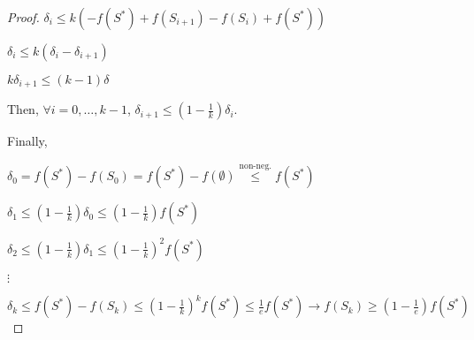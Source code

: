 \begin{proof}
        $\delta_i \leq k (-f(S^*) + f(S_{i+1}) - f(S_i) + f(S^*))$

        $\delta_i \leq k (\delta_i - \delta_{i+1})$

        $k \delta_{i+1} \leq (k-1) \delta$

        Then, $\forall i = 0, \dots, k-1$, $\delta_{i+1} \leq (1 - \frac{1}{k}) \delta_i$.

        Finally,

        $\delta_0 = f(S^*) - f(S_0) = f(S^*) - f(\emptyset) \overset{\text{non-neg.}}{\leq} f(S^*)$

        $\delta_1 \leq (1 - \frac{1}{k}) \delta_0 \leq (1 - \frac{1}{k}) f(S^*)$

        $\delta_2 \leq (1 - \frac{1}{k}) \delta_1 \leq (1 - \frac{1}{k})^2 f(S^*)$

        $\vdots$

        $\delta_k \leq f(S^*) - f(S_k) \leq (1 - \frac{1}{k})^k f(S^*) \leq \frac{1}{e} f(S^*) \rightarrow f(S_k) \geq (1 - \frac{1}{e}) f(S^*)$
    \end{proof}